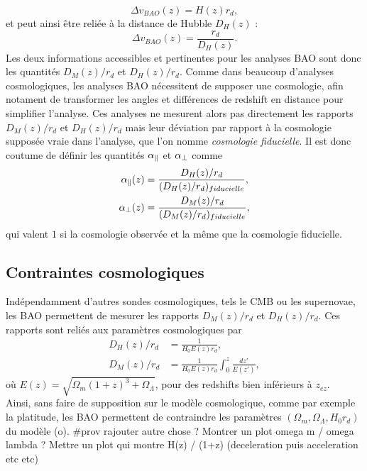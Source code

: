 \documentclass[11pt, twoside, a4paper, openright]{report}
\begin{document}
\begin{equation}
  \label{eq:v_bao}
  \Delta v_{BAO}(z) = H(z) r_d ,
\end{equation}
et peut ainsi être reliée à la distance de Hubble $D_H(z)$ :
\begin{equation}
  \label{eq:v_bao2}
  \Delta v_{BAO}(z) = \frac{r_d }{D_H(z)}.
\end{equation}
Les deux informations accessibles et pertinentes pour les analyses BAO sont donc les quantités $D_M(z) / r_d$ et $D_H(z) / r_d$. Comme dans beaucoup d'analyses cosmologiques, les analyses BAO nécessitent de supposer une cosmologie, afin notament de transformer les angles et différences de redshift en distance pour simplifier l'analyse. Ces analyses ne mesurent alors pas directement les rapports  $D_M(z) / r_d$ et $D_H(z) / r_d$ mais leur déviation par rapport à la cosmologie supposée vraie dans l'analyse, que l'on nomme \emph{cosmologie fiducielle}. Il est donc coutume de définir les quantités $\alpha_{\parallel}{}$ et $\alpha_{\perp}{}$ comme
\begin{align}
  \label{eq:apar}
  \alpha_{\parallel}{}(z) &= \frac{D_H(z) / r_d}{(D_H(z) / r_d)_{fiducielle}} , \\
  \label{eq:aperp}
  \alpha_{\perp}{}(z) &= \frac{D_M(z) / r_d}{(D_M(z) / r_d)_{fiducielle}} ,
\end{align}
qui valent $1$ si la cosmologie observée et la même que la cosmologie fiducielle.


\subsection{Contraintes cosmologiques}
Indépendamment d'autres sondes cosmologiques, tels le CMB ou les supernovae, les BAO permettent de mesurer les rapports $D_M(z) / r_d$ et $D_H(z) / r_d$. Ces rapports sont reliés aux paramètres cosmologiques par
\begin{align}
  D_H(z) / r_d &= \frac{1}{H_0 E(z) r_d}, \\
  D_M(z) / r_d &= \frac{1}{H_0 E(z) r_d} \int_0^z \frac{dz'}{E(z')},
\end{align}
où $E(z) = \sqrt{\Omega_m (1+z)^3 + \Omega_{\Lambda}}$, pour des redshifts bien inférieurs à $z_{ez}$. \\
Ainsi, sans faire de supposition sur le modèle cosmologique, comme par exemple la platitude, les BAO permettent de contraindre les paramètres $(\Omega_{m} , \Omega_{\Lambda} , H_0 r_d)$ du modèle (o)\lcdm{}.
\#prov rajouter autre chose ? Montrer un plot omega m / omega lambda ?
Mettre un plot qui montre H(z) / (1+z) (deceleration puis acceleration etc etc)
\end{document}
